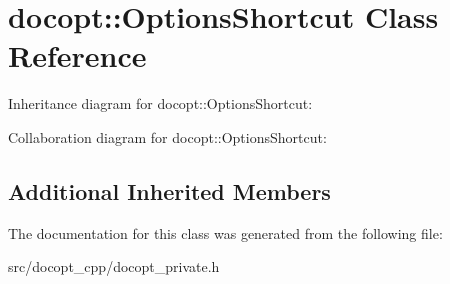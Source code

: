 \hypertarget{classdocopt_1_1OptionsShortcut}{}\section{docopt\+:\+:Options\+Shortcut Class Reference}
\label{classdocopt_1_1OptionsShortcut}


Inheritance diagram for docopt\+:\+:Options\+Shortcut\+:


Collaboration diagram for docopt\+:\+:Options\+Shortcut\+:
\subsection*{Additional Inherited Members}


The documentation for this class was generated from the following file\+:\begin{DoxyCompactItemize}
\item 
src/docopt\+\_\+cpp/docopt\+\_\+private.\+h\end{DoxyCompactItemize}

